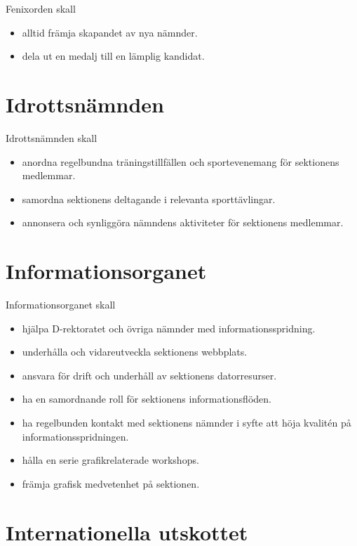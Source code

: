 \documentclass{dgovdoc}
\begin{document}
Fenixorden skall

\begin{itemize} 
\item alltid främja skapandet av nya nämnder. 
\item dela ut en medalj till en lämplig kandidat.
\end{itemize}

\section{Idrottsnämnden}

Idrottsnämnden skall

\begin{itemize}
\item anordna regelbundna träningstillfällen och sportevenemang för sektionens
  medlemmar.
\item samordna sektionens deltagande i relevanta sporttävlingar.
\item annonsera och synliggöra nämndens aktiviteter för sektionens medlemmar.
\end{itemize}

\section{Informationsorganet}

Informationsorganet skall

\begin{itemize}
\item hjälpa D-rektoratet och övriga nämnder med informationsspridning.
\item underhålla och vidareutveckla sektionens webbplats.
\item ansvara för drift och underhåll av sektionens datorresurser.
\item ha en samordnande roll för sektionens informationsflöden.
\item ha regelbunden kontakt med sektionens nämnder i syfte att höja kvalitén
  på informationsspridningen.
\item hålla en serie grafikrelaterade workshops.
\item främja grafisk medvetenhet på sektionen.
\end{itemize}

\section{Internationella utskottet}
\end{document}
